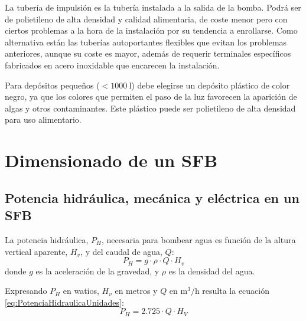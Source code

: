 La tubería de impulsión es la tubería instalada a la salida de la
bomba. Podrá ser de polietileno de alta densidad y calidad alimentaria,
de coste menor pero con ciertos problemas a la hora de la instalación
por su tendencia a enrollarse. Como alternativa están las tuberías
autoportantes flexibles que evitan los problemas anteriores, aunque
su coste es mayor, además de requerir terminales específicos fabricados
en acero inoxidable que encarecen la instalación. 

Para depósitos pequeños ($<\SI{1000}{\litre}$) debe elegirse un depósito
plástico de color negro, ya que los colores que permiten el paso de
la luz favorecen la aparición de algas y otros contaminantes. Este
plástico puede ser polietileno de alta densidad para uso alimentario.


\section{Dimensionado de un SFB}


\subsection{Potencia hidráulica, mecánica y eléctrica en un SFB}

La potencia hidráulica, $P_{H}$, necesaria para bombear agua es función
de la altura vertical aparente, $H_{v}$,
y del caudal de agua, $Q$:\begin{equation}
P_{H}=g\cdot\rho\cdot Q\cdot H_{v}\label{eq:PotenciaHidraulica}\end{equation}
donde $g$ es la aceleración de la gravedad, y $\rho$ es la densidad
del agua. 

Expresando $P_{H}$ en watios, $H_{v}$ en metros y $Q$ en $\si{\meter\cubed\per\hour}$
resulta la ecuación \ref{eq:PotenciaHidraulicaUnidades}: \begin{equation}
P_{H}=2.725\cdot Q\cdot H_{V}\label{eq:PotenciaHidraulicaUnidades}\end{equation}


